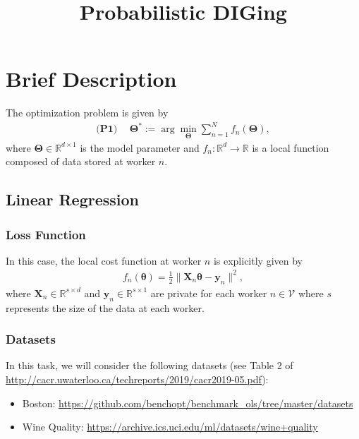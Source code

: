 \documentclass[12pt,draftclsnofoot,onecolumn]{IEEEtran}
\begin{document}
\title{Probabilistic DIGing}



\maketitle

\section{Brief Description}
The optimization problem is given by
\begin{align}
\textbf{(P1)} ~~ &\bm{\Theta}^* := \arg\min_{\bm{\Theta}} \sum_{n=1}^N f_n(\bm{\Theta}),
\end{align}
where $\bm{\Theta} \in  \mathbb{R}^{d \times 1}$ is the model parameter and $f_n: \mathbb{R}^d \rightarrow \mathbb{R}$ is a local function composed of data stored at worker $n$.

\subsection{Linear Regression}
\subsubsection{Loss Function}
In this case, the local cost function at worker $n$ is explicitly given by
\begin{align}
f_n(\bm{\theta}) = \frac{1}{2} \| \bm{X}_n \bm{\theta} - \bm{y}_n\|^2,
\end{align}
where $\bm{X}_n \in \mathbb{R}^{s \times d}$ and $\bm{y}_n \in \mathbb{R}^{s \times 1}$ are private for each worker $n \in \mathcal{V}$ where $s$ represents the size of the data at each worker.
\subsubsection{Datasets}
In this task, we will consider the following datasets (see Table 2 of \url{http://cacr.uwaterloo.ca/techreports/2019/cacr2019-05.pdf}):
\begin{itemize}
\item Boston: \url{https://github.com/benchopt/benchmark_ols/tree/master/datasets}
\item Wine Quality: \url{https://archive.ics.uci.edu/ml/datasets/wine+quality}
\end{itemize}
\end{document}
